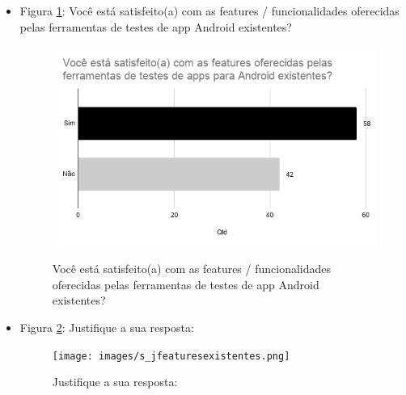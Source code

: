 \begin{itemize}
    
    \item Figura \ref{figure:s_featuresexistentes}: Você está satisfeito(a) com as features  / funcionalidades oferecidas pelas ferramentas de testes de app Android existentes?
    \begin{figure}[!htb]
    \centering
    \includegraphics[width=.55\textwidth]{images/s_featuresexistentes.png}
    \label{figure:s_featuresexistentes}
    \caption{Você está satisfeito(a) com as features  / funcionalidades oferecidas pelas ferramentas de testes de app Android existentes?}
    \end{figure}


    \item Figura \ref{figure:s_jfeaturesexistentes}: Justifique a sua resposta:
    \begin{figure}[!htb]
    \centering
    \texttt{[image: images/s\_jfeaturesexistentes.png]}
    \label{figure:s_jfeaturesexistentes}
    \caption{Justifique a sua resposta:}
    \end{figure}   
    
    
\end{itemize}
















